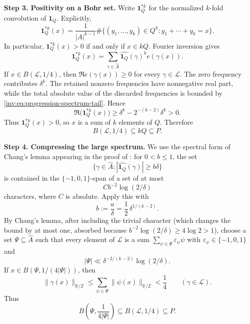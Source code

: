 \documentclass[twoside]{aomart}
\makeatletter
\theoremstyle{paperplain}
\theoremstyle{paperdefinition}
\renewenvironment{proof}[1][\proofname]{\par\pushQED{\qed}%
  \normalfont\topsep6\p@\@plus3\p@\relax\trivlist
  \item[\hskip\labelsep\itshape #1\@addpunct{.}]\ignorespaces
}{\popQED\endtrivlist\@endpefalse}
\numberwithin{equation}{section}
\makeatother
\begin{document}
\begin{proof}
\par
\medskip
\noindent\textbf{Step 3. Positivity on a Bohr set.}
Write $\mathbf1_Q^{*k}$ for the normalized $k$-fold convolution of
$\mathbf1_Q$. Explicitly,
\begin{equation*}
 \mathbf1_Q^{*k}(x)
 =\frac{1}{|A|^{k-1}}
   \#\{(y_1,\ldots,y_k)\in Q^k:y_1+\cdots+y_k=x\}.
\end{equation*}
In particular, $\mathbf1_Q^{*k}(x)>0$ if and only if $x\in kQ$.
Fourier inversion gives
\begin{equation*}
 \mathbf 1_Q^{*k}(x)
 =\sum_{\gamma\in\widehat A}
       \widehat{\mathbf 1_Q}(\gamma)^k e(\gamma(x)).
\end{equation*}
If $x\in B(\mathcal L,1/4)$, then
$\Re e(\gamma(x))\ge0$ for every $\gamma\in\mathcal L$. The zero
frequency contributes $\delta^k$. The retained nonzero frequencies have
nonnegative real part, while the total absolute value of the discarded
frequencies is bounded by
\eqref{inv:eq:progression-spectrum-tail}. Hence
\begin{equation*}
 \Re\bigl(\mathbf 1_Q^{*k}(x)\bigr)
 \ge \delta^k-2^{-(k-2)}\delta^k>0.
\end{equation*}
Thus $\mathbf 1_Q^{*k}(x)>0$, so $x$ is a sum of $k$ elements of $Q$.
Therefore
\begin{equation*}
 B(\mathcal L,1/4)\subseteq kQ\subseteq P.
\end{equation*}

\par
\medskip
\noindent\textbf{Step 4. Compressing the large spectrum.}
We use the spectral form of Chang's lemma appearing in the proof of
\cite[Proposition~28]{Milicevic}: for $0<b\le1$, the set
\[
 \{\gamma\in\widehat A:
     |\widehat{\mathbf 1_Q}(\gamma)|\ge b\delta\}
\]
is contained in the $\{-1,0,1\}$-span of a set of at most
\begin{equation*}
 C b^{-2}\log(2/\delta)
\end{equation*}
characters, where $C$ is absolute. Apply this with
\begin{equation*}
 b:=\frac a\delta=\frac12\,\delta^{1/(k-2)}.
\end{equation*}
By Chang's lemma, after including the trivial character (which changes
the bound by at most one, absorbed because
$b^{-2}\log(2/\delta)\ge4\log2>1$), choose a set
$\Psi\subseteq\widehat A$ such that every element of
$\mathcal L$ is a sum
$\displaystyle\sum_{\psi\in\Psi}\varepsilon_\psi\psi$ with
$\varepsilon_\psi\in\{-1,0,1\}$ and
\begin{equation}
 |\Psi|\ll
 \delta^{-2/(k-2)}\log(2/\delta).
 \label{inv:eq:progression-chang-bound}
\end{equation}
If $x\in B(\Psi,1/(4|\Psi|))$, then
\begin{equation*}
 \|\gamma(x)\|_{\mathbb R/\mathbb Z}
 \le\sum_{\psi\in\Psi}\|\psi(x)\|_{\mathbb R/\mathbb Z}
 <\frac14
 \qquad(\gamma\in\mathcal L).
\end{equation*}
Thus
\begin{equation}
 B\!\left(\Psi,\frac1{4|\Psi|}\right)
 \subseteq B(\mathcal L,1/4)\subseteq P.
 \label{inv:eq:progression-bohr-containment}
\end{equation}


\end{proof}
\end{document}
